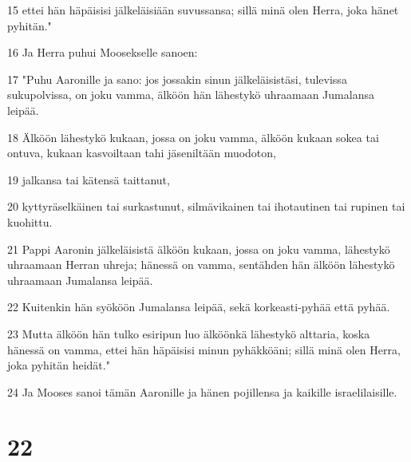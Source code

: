 \par 15 ettei hän häpäisisi jälkeläisiään suvussansa; sillä minä olen Herra, joka hänet pyhitän."
\par 16 Ja Herra puhui Moosekselle sanoen:
\par 17 "Puhu Aaronille ja sano: jos jossakin sinun jälkeläisistäsi, tulevissa sukupolvissa, on joku vamma, älköön hän lähestykö uhraamaan Jumalansa leipää.
\par 18 Älköön lähestykö kukaan, jossa on joku vamma, älköön kukaan sokea tai ontuva, kukaan kasvoiltaan tahi jäseniltään muodoton,
\par 19 jalkansa tai kätensä taittanut,
\par 20 kyttyräselkäinen tai surkastunut, silmävikainen tai ihotautinen tai rupinen tai kuohittu.
\par 21 Pappi Aaronin jälkeläisistä älköön kukaan, jossa on joku vamma, lähestykö uhraamaan Herran uhreja; hänessä on vamma, sentähden hän älköön lähestykö uhraamaan Jumalansa leipää.
\par 22 Kuitenkin hän syököön Jumalansa leipää, sekä korkeasti-pyhää että pyhää.
\par 23 Mutta älköön hän tulko esiripun luo älköönkä lähestykö alttaria, koska hänessä on vamma, ettei hän häpäisisi minun pyhäkköäni; sillä minä olen Herra, joka pyhitän heidät."
\par 24 Ja Mooses sanoi tämän Aaronille ja hänen pojillensa ja kaikille israelilaisille.

\chapter{22}

